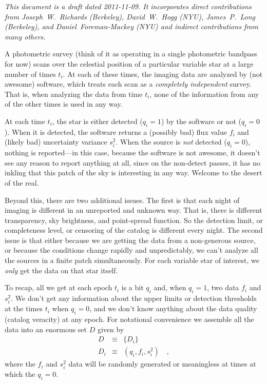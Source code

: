 \documentclass[12pt]{article}
\begin{document}
\sloppy\sloppypar\raggedbottom

\textsl{This document is a draft dated 2011-11-09.  It incorporates
  direct contributions from Joseph~W.~Richards (Berkeley),
  David~W.~Hogg (NYU), James~P.~Long (Berkeley), and
  Daniel~Foreman-Mackey (NYU) and indirect contributions from many
  others.}

\vspace{1ex}

A photometric survey (think of it as operating in a single photometric
bandpass for now) scans over the celestial position of a particular
variable star at a large number of times $t_i$.  At each of these
times, the imaging data are analyzed by (not awesome) software, which
treats each scan as a \emph{completely independent} survey.  That is,
when analyzing the data from time $t_i$, none of the information from
any of the other times is used in any way.

At each time $t_i$, the star is either detected ($q_i=1$) by the
software or not ($q_i=0$).  When it is detected, the software returns
a (possibly bad) flux value $f_i$ and (likely bad) uncertainty
variance $s_i^2$.  When the source is \emph{not} detected ($q_i=0$),
nothing is reported---in this case, because the software is not
awesome, it doesn't see any reason to report anything at all, since on
the non-detect passes, it has no inkling that this patch of the sky is
interesting in any way.  Welcome to the desert of the real.

Beyond this, there are two additional issues.  The first is that each
night of imaging is different in an unreported and unknown way.  That
is, there is different transparency, sky brightness, and point-spread
function.  So the detection limit, or completeness level, or censoring
of the catalog is different every night.  The second issue is that
either because we are getting the data from a non-generous source, or
because the conditions change rapidly and unpredictably, we can't
analyze all the sources in a finite patch simultaneously.  For each
variable star of interest, we \emph{only} get the data on that star
itself.

To recap, all we get at each epoch $t_i$ is a bit $q_i$ and, when
$q_i=1$, two data $f_i$ and $s_i^2$.  We don't get any information
about the upper limits or detection thresholds at the times $t_i$ when
$q_i=0$, and we don't know anything about the data quality (catalog
veracity) at any epoch.  For notational convenience we assemble all
the data into an enormous set $D$ given by
\begin{eqnarray}\displaystyle
D &\equiv& \{D_i\}
\\
D_i &\equiv& (q_i, f_i, s_i^2)
\quad ,
\end{eqnarray}
where the $f_i$ and $s_i^2$ data will be randomly generated or
meaningless at times at which the $q_i=0$.
\end{document}
